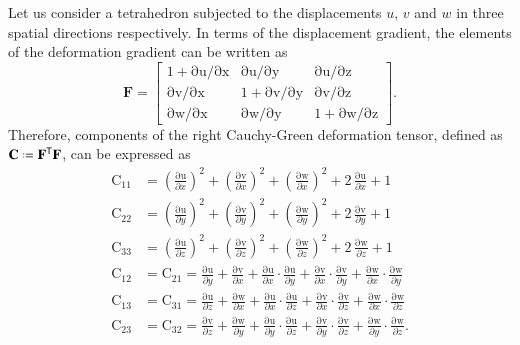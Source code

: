 Let us consider a tetrahedron subjected to the displacements $u$, $v$ and $w$ in three spatial directions respectively. In terms of the displacement gradient, the elements of the deformation gradient can be written as
\begin{equation}
\mathbf{F} =  
\begin{bmatrix}
1 + \mathrm{\partial u / \partial x} & \mathrm{\partial u / \partial y} & \mathrm{\partial u / \partial z} \\
\mathrm{\partial v / \partial x} & 1 + \mathrm{\partial v / \partial y} & \mathrm{\partial v / \partial z} \\
\mathrm{\partial w / \partial x} & \mathrm{\partial w / \partial y} & 1 + \mathrm{\partial w / \partial z}
\end{bmatrix} .
\end{equation}	
Therefore, components of the right Cauchy-Green deformation tensor, defined as $\mathbf{C} \defeq \mathbf{F}^\mathsf{T}\mathbf{F}$, can be expressed as
\begin{subequations}
    \begin{align}	
    \mathrm{C_{11}} & = \left(\frac{\mathrm{\partial u}}{\partial x}\right)^2 + \left(\frac{\mathrm{\partial v}}{\partial x}\right)^2 + \left(\frac{\mathrm{\partial w}}{\partial x}\right)^2 + 2\, \frac{\mathrm{\partial u}}{\partial x}  + 1\\
    \mathrm{C_{22}} & = \left(\frac{\mathrm{\partial u}}{\partial y}\right)^2 + \left(\frac{\mathrm{\partial v}}{\partial y}\right)^2 + \left(\frac{\mathrm{\partial w}}{\partial y}\right)^2 + 2\, \frac{\mathrm{\partial v}}{\partial y} + 1\\
    \mathrm{C_{33}} & = \left(\frac{\mathrm{\partial u}}{\partial z}\right)^2 + \left(\frac{\mathrm{\partial v}}{\partial z}\right)^2 + \left(\frac{\mathrm{\partial w}}{\partial z}\right)^2 + 2\, \frac{\mathrm{\partial w}}{\partial z} + 1 \\
    \mathrm{C_{12}} & = \mathrm{C_{21}} = \frac{\mathrm{\partial u}}{\partial y} + \frac{\mathrm{\partial v}}{\partial x} + \frac{\mathrm{\partial u}}{\partial x} \cdot \frac{\mathrm{\partial u}}{\partial y} + \frac{\mathrm{\partial v}}{\partial x} \cdot \frac{\mathrm{\partial v}}{\partial y} + \frac{\mathrm{\partial w}}{\partial x} \cdot \frac{\mathrm{\partial w}}{\partial y}\\
    \mathrm{C_{13}} & = \mathrm{C_{31}} = \frac{\mathrm{\partial u}}{\partial z} + \frac{\mathrm{\partial w}}{\partial x} + \frac{\mathrm{\partial u}}{\partial x} \cdot \frac{\mathrm{\partial u}}{\partial z} + \frac{\mathrm{\partial v}}{\partial x} \cdot \frac{\mathrm{\partial v}}{\partial z} + \frac{\mathrm{\partial w}}{\partial x} \cdot \frac{\mathrm{\partial w}}{\partial z} \\
    \mathrm{C_{23}} & = \mathrm{C_{32}} = \frac{\mathrm{\partial v}}{\partial z} + \frac{\mathrm{\partial w}}{\partial y} + \frac{\mathrm{\partial u}}{\partial y} \cdot \frac{\mathrm{\partial u}}{\partial z} + \frac{\mathrm{\partial v}}{\partial y} \cdot \frac{\mathrm{\partial v}}{\partial z} + \frac{\mathrm{\partial w}}{\partial y} \cdot \frac{\mathrm{\partial w}}{\partial z}.
    \end{align}
\end{subequations}
